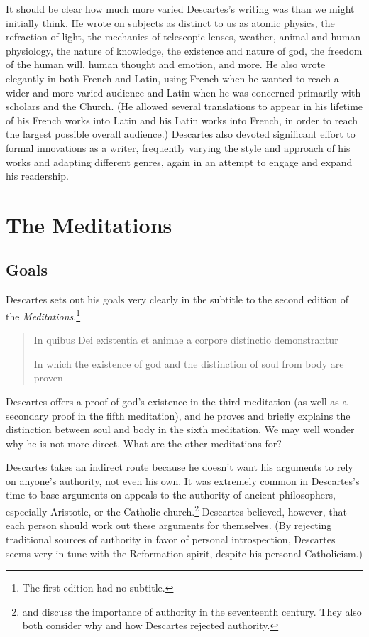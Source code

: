 It should be clear how much more varied Descartes's writing was than we might initially think. He wrote on subjects as distinct to us as atomic physics, the refraction of light, the mechanics of telescopic lenses, weather, animal and human physiology, the nature of knowledge, the existence and nature of god, the freedom of the human will, human thought and emotion, and more. He also wrote elegantly in both French and Latin, using French when he wanted to reach a wider and more varied audience and Latin when he was concerned primarily with scholars and the Church. (He allowed several translations to appear in his lifetime of his French works into Latin and his Latin works into French, in order to reach the largest possible overall audience.) Descartes also devoted significant effort to formal innovations as a writer, frequently varying the style and approach of his works and adapting different genres, again in an attempt to engage and expand his readership.

\section*{The Meditations}

\subsection*{Goals}

Descartes sets out his goals very clearly in the subtitle to the second edition of the \textit{Meditations}.\footnote{The first edition had no subtitle.}

\begin{quote}
    In quibus Dei existentia et animae a corpore distinctio demonstrantur

    In which the existence of god and the distinction of soul from body are proven
\end{quote}

Descartes offers a proof of god's existence in the third meditation (as well as a secondary proof in the fifth meditation), and he proves and briefly explains the distinction between soul and body in the sixth meditation. We may well wonder why he is not more direct. What are the other meditations for?

Descartes takes an indirect route because he doesn't want his arguments to rely on anyone's authority, not even his own. It was extremely common in Descartes's time to base arguments on appeals to the authority of ancient philosophers, especially Aristotle, or the Catholic church.\footnote{\citet[4--7]{cottingham1986} and \citet[4--5]{garber1998} discuss the importance of authority in the seventeenth century. They also both consider why and how Descartes rejected authority.} Descartes believed, however, that each person should work out these arguments for themselves. (By rejecting traditional sources of authority in favor of personal introspection, Descartes seems very in tune with the Reformation spirit, despite his personal Catholicism.)

